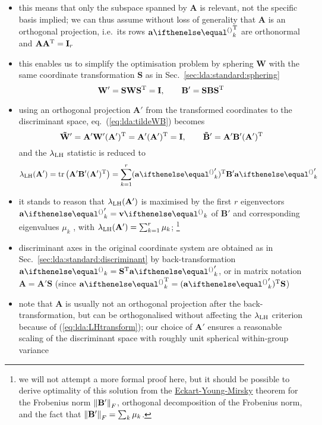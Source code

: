 \documentclass[a4paper]{article}
\begin{document}
\begin{itemize}
 \item this means that only the subspace spanned by $\mathbf{A}$ is relevant, not the specific basis implied; we can thus assume without loss of generality that $\mathbf{A}$ is an orthogonal projection, i.e.\ its rows $\va_k\T$ are orthonormal and $\mathbf{A} \mathbf{A}\T = \mathbf{I}_r$
 \item this enables us to simplify the optimisation problem by sphering $\mathbf{W}$ with the same coordinate transformation $\mathbf{S}$ as in Sec.~\ref{sec:lda:standard:sphering}
   \[
     \mathbf{W}' = \mathbf{S} \mathbf{W} \mathbf{S}\T = \mathbf{I},\qquad
     \mathbf{B}' = \mathbf{S} \mathbf{B} \mathbf{S}\T
   \]
 \item using an orthogonal projection $\mathbf{A}'$ from the transformed coordinates to the discriminant space, eq.~(\ref{eq:lda:tildeWB}) becomes
   \begin{equation}
     \label{eq:lda:tildeWBprime}
     \tmat W' = \mathbf{A}' \mathbf{W}' (\mathbf{A}')\T = \mathbf{A}' (\mathbf{A}')\T = \mathbf{I},\qquad
     \tmat B' = \mathbf{A}' \mathbf{B}' (\mathbf{A}')\T
   \end{equation}
   and the $\llh$ statistic is reduced to
   \begin{equation}
     \label{eq:lda:LHprime}
     \llh(\mathbf{A}') = \Trace{\mathbf{A}' \mathbf{B}' (\mathbf{A}')\T}
     = \sum_{k=1}^r (\va_k')\T \mathbf{B}' \va_k'
   \end{equation}
 \item it stands to reason that $\llh(\mathbf{A}')$ is maximised by the first $r$ eigenvectors $\va_k' = \vv_k$ of $\mathbf{B}'$ and corresponding eigenvalues $\mu_k$ \citep[332]{Venables:Ripley:02}, with $\llh(\mathbf{A}') = \sum_{k=1}^r \mu_k$;%
   \footnote{we will not attempt a more formal proof here, but it should be possible to derive optimality of this solution from the \href{https://en.wikipedia.org/wiki/Low-rank_approximation\#Proof_of_Eckart–Young–Mirsky_theorem_(for_Frobenius_norm)}{Eckart-Young-Mirsky} theorem for the Frobenius norm $\Norm[F]{\mathbf{B}'}$, orthogonal decomposition of the Frobenius norm, and the fact that $\Norm[F]{\mathbf{B}'} = \sum_k \mu_k$.}
 \item discriminant axes in the original coordinate system are obtained as in Sec.~\ref{sec:lda:standard:discriminant} by back-transformation $\va_k = \mathbf{S}\T \va_k'$, or in matrix notation $\mathbf{A} = \mathbf{A}' \mathbf{S}$ (since $\va_k\T = (\va_k')\T \mathbf{S}$)
 \item note that $\mathbf{A}$ is usually not an orthogonal projection after the back-transformation, but can be orthogonalised without affecting the $\llh$ criterion because of (\ref{eq:lda:LHtransform}); our choice of $\mathbf{A}'$ ensures a reasonable scaling of the discriminant space with roughly unit spherical within-group variance%

\end{itemize}
\end{document}
